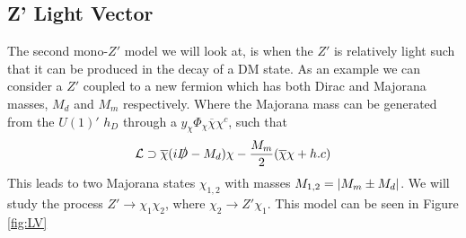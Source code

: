 \documentclass[12pt, a4paper]{book}
\begin{document}
\subsection{Z' Light Vector}
The second mono-$Z'$ model we will look at, is when the $Z'$ is relatively light such that it can be produced in the decay of a DM state. As an example we can consider a $Z'$ 
coupled to a new fermion which has both Dirac and Majorana masses, $M_d$ and $M_m$ respectively. Where the Majorana mass can be generated from the $U(1)'$ $h_D$ through a $y_\chi\Phi_\chi\overline{\chi}\chi^c$, such that
$$
\mathcal{L}\supset \overline{\chi}(i\slashed{D}-M_d)\chi - \frac{M_m}{2}(\overline{\chi}\chi + h.c)
$$
This leads to two Majorana states $\chi_{1,2}$ with masses $M_{1,2}=\abs{M_m\pm M_d}$. We will study the process $Z'\rightarrow\chi_1\chi_2$, where $\chi_2\rightarrow Z'\chi_1$. This model can be seen in Figure \ref{fig:LV}
\end{document}
